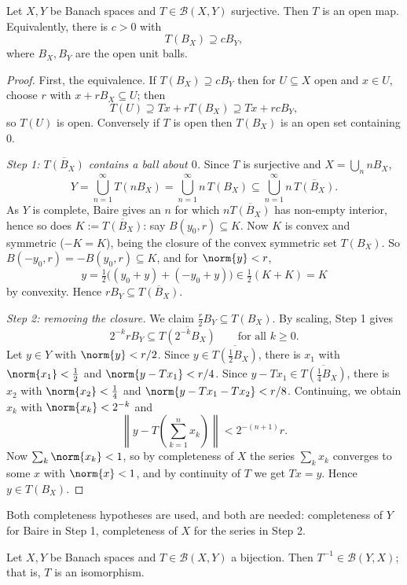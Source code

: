 \documentclass[a4paper]{scrartcl}
\newcommand{\Bop}{\mathcal{B}}
\begin{document}
\begin{theorem}
	Let $X, Y$ be Banach spaces and $T \in \Bop(X,Y)$ surjective. Then $T$ is an open map. Equivalently, there is $c > 0$ with
	$$T(B_X) \supseteq c B_Y,$$
	where $B_X, B_Y$ are the open unit balls.
\end{theorem}

\begin{proof}
	First, the equivalence. If $T(B_X) \supseteq cB_Y$ then for $U \subseteq X$ open and $x \in U$, choose $r$ with $x + rB_X \subseteq U$; then
	$$T(U) \supseteq Tx + rT(B_X) \supseteq Tx + rcB_Y,$$
	so $T(U)$ is open. Conversely if $T$ is open then $T(B_X)$ is an open set containing $0$.

	\emph{Step 1: $\overline{T(B_X)}$ contains a ball about $0$.} Since $T$ is surjective and $X = \bigcup_n nB_X$,
	$$Y = \bigcup_{n=1}^\infty T(nB_X) = \bigcup_{n=1}^\infty n\, T(B_X) \subseteq \bigcup_{n=1}^\infty n\,\overline{T(B_X)}.$$
	As $Y$ is complete, Baire gives an $n$ for which $n\overline{T(B_X)}$ has non-empty interior, hence so does $K := \overline{T(B_X)}$: say $B(y_0, r) \subseteq K$. Now $K$ is convex and symmetric ($-K = K$), being the closure of the convex symmetric set $T(B_X)$. So $B(-y_0,r) = -B(y_0,r) \subseteq K$, and for $\norm{y} < r$,
	$$y = \tfrac12\big((y_0 + y) + (-y_0 + y)\big) \in \tfrac12(K + K) = K$$
	by convexity. Hence $rB_Y \subseteq \overline{T(B_X)}$.

	\emph{Step 2: removing the closure.} We claim $\frac{r}{2}B_Y \subseteq T(B_X)$. By scaling, Step 1 gives
	$$2^{-k} r B_Y \subseteq \overline{T(2^{-k}B_X)} \qquad \text{for all } k \geq 0.$$
	Let $y \in Y$ with $\norm{y} < r/2$. Since $y \in \overline{T(\frac12 B_X)}$, there is $x_1$ with $\norm{x_1} < \frac12$ and $\norm{y - Tx_1} < r/4$. Since $y - Tx_1 \in \overline{T(\frac14 B_X)}$, there is $x_2$ with $\norm{x_2} < \frac14$ and $\norm{y - Tx_1 - Tx_2} < r/8$. Continuing, we obtain $x_k$ with $\norm{x_k} < 2^{-k}$ and
	$$\left\| y - T\left(\sum_{k=1}^n x_k\right) \right\| < 2^{-(n+1)}r.$$
	Now $\sum_k \norm{x_k} < 1$, so by completeness of $X$ the series $\sum_k x_k$ converges to some $x$ with $\norm{x} < 1$, and by continuity of $T$ we get $Tx = y$. Hence $y \in T(B_X)$.
\end{proof}

Both completeness hypotheses are used, and both are needed: completeness of $Y$ for Baire in Step 1, completeness of $X$ for the series in Step 2.

\begin{theorem}
	Let $X, Y$ be Banach spaces and $T \in \Bop(X,Y)$ a bijection. Then $T^{-1} \in \Bop(Y,X)$; that is, $T$ is an isomorphism.
\end{theorem}
\end{document}
